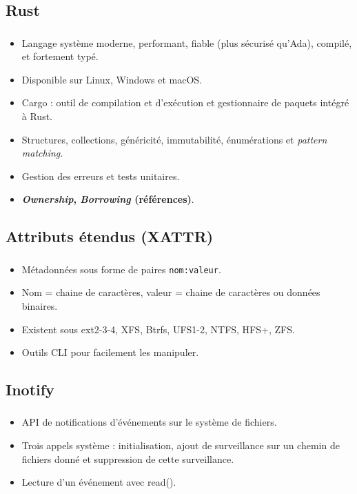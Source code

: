 \documentclass[10pt]{beamer}
\begin{document}
\subsection{Rust}
\begin{frame}
    \frametitle{\subsecname}
    \begin{itemize}
        \item Langage système moderne, performant, fiable (plus sécurisé qu'Ada), compilé, et fortement typé.
        \pause
        \item Disponible sur Linux, Windows et macOS.
        \pause
        \item Cargo : outil de compilation et d'exécution et gestionnaire de paquets intégré à Rust.
        \pause
        \item Structures, collections, généricité, immutabilité, énumérations et \textit{pattern matching}.
        \pause
        \item Gestion des erreurs et tests unitaires.
        \pause
        \item \textbf{\textit{Ownership}, \textit{Borrowing} (références)}.
    \end{itemize}
\end{frame}

\subsection{Attributs étendus (XATTR)}
\begin{frame}
    \frametitle{\subsecname}
    \begin{itemize}
        \pause
        \item Métadonnées sous forme de paires \texttt{nom:valeur}.
        \pause
        \item Nom = chaine de caractères, valeur = chaine de caractères ou données binaires.
        \pause
        \item Existent sous ext2-3-4, XFS, Btrfs, UFS1-2, NTFS, HFS+, ZFS.
        \pause
        \item Outils CLI pour facilement les manipuler.
    \end{itemize}
\end{frame}

\subsection{Inotify}
\begin{frame}
    \frametitle{\subsecname}
    \begin{itemize}
        \pause
        \item API de notifications d'événements sur le système de fichiers.
        \pause
        \item Trois appels système : initialisation, ajout de surveillance sur un chemin de fichiers 
            donné et suppression de cette surveillance.
        \pause
        \item Lecture d'un événement avec read().
    \end{itemize}
\end{frame}
\end{document}

